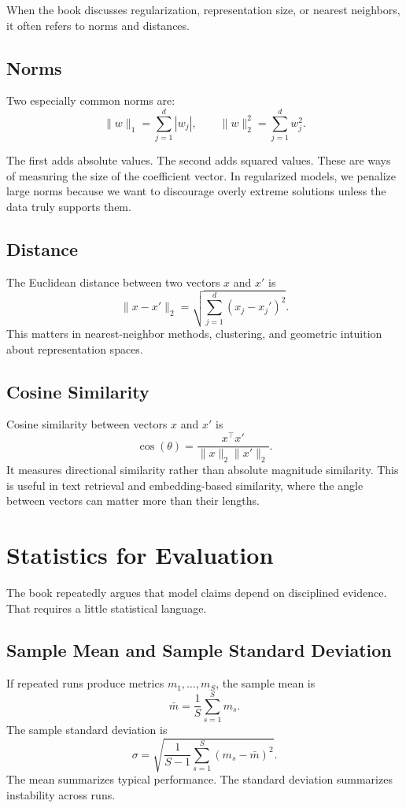 When the book discusses regularization, representation size, or nearest neighbors, it often refers to norms and distances.

\subsection{Norms}

Two especially common norms are:
\[
\|w\|_1 = \sum_{j=1}^{d} |w_j|,
\qquad
\|w\|_2^2 = \sum_{j=1}^{d} w_j^2.
\]

The first adds absolute values. The second adds squared values. These are ways of measuring the size of the coefficient vector. In regularized models, we penalize large norms because we want to discourage overly extreme solutions unless the data truly supports them.

\subsection{Distance}

The Euclidean distance between two vectors $x$ and $x'$ is
\[
\|x-x'\|_2 = \sqrt{\sum_{j=1}^{d}(x_j - x_j')^2}.
\]
This matters in nearest-neighbor methods, clustering, and geometric intuition about representation spaces.

\subsection{Cosine Similarity}

Cosine similarity between vectors $x$ and $x'$ is
\[
\cos(\theta) = \frac{x^\top x'}{\|x\|_2\|x'\|_2}.
\]
It measures directional similarity rather than absolute magnitude similarity. This is useful in text retrieval and embedding-based similarity, where the angle between vectors can matter more than their lengths.

\section{Statistics for Evaluation}

The book repeatedly argues that model claims depend on disciplined evidence. That requires a little statistical language.

\subsection{Sample Mean and Sample Standard Deviation}

If repeated runs produce metrics $m_1,\ldots,m_S$, the sample mean is
\[
\bar{m} = \frac{1}{S}\sum_{s=1}^{S} m_s.
\]
The sample standard deviation is
\[
\sigma = \sqrt{\frac{1}{S-1}\sum_{s=1}^{S}(m_s - \bar{m})^2}.
\]
The mean summarizes typical performance. The standard deviation summarizes instability across runs.

